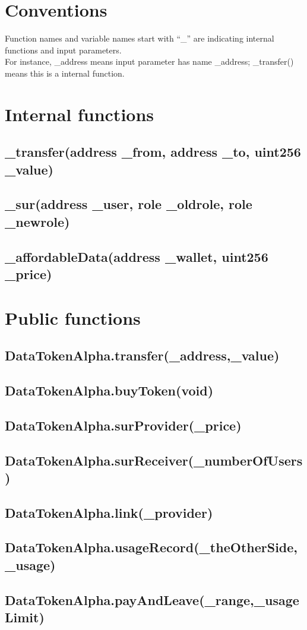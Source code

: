 \documentclass[12pt]{article}
\begin{document}
\tableofcontents
\section{Conventions}
Function names and variable names start with ``\_'' are indicating internal functions and input parameters.\\
For instance, \_address means input parameter has name \_address; \_transfer() means this is a internal function.

\section{Internal functions}
\subsection{\_transfer(address \_from, address \_to, uint256 \_value)}
\subsection{\_sur(address \_user, role \_oldrole, role \_newrole)}
\subsection{\_affordableData(address \_wallet, uint256 \_price)}

\section{Public functions}    
\subsection{DataTokenAlpha.transfer(\_address,\_value)}
\subsection{DataTokenAlpha.buyToken(void)}
\subsection{DataTokenAlpha.surProvider(\_price)}
\subsection{DataTokenAlpha.surReceiver(\_numberOfUsers)}
\subsection{DataTokenAlpha.link(\_provider)}
\subsection{DataTokenAlpha.usageRecord(\_theOtherSide,\_usage)}
\subsection{DataTokenAlpha.payAndLeave(\_range,\_usageLimit)}
\end{document}
